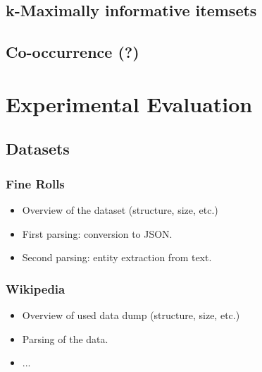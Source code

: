 \documentclass[paper=a4, fontsize=11pt]{scrartcl}
\begin{document}

\subsection{k-Maximally informative itemsets}

\subsection{Co-occurrence (?)}




\section{Experimental Evaluation}
\label{sec:experiments}

\subsection{Datasets}

\subsubsection{Fine Rolls}

\begin{itemize}
	\item Overview of the dataset (structure, size, etc.)
	\item First parsing: conversion to JSON.
	\item Second parsing: entity extraction from text.
\end{itemize}


\subsubsection{Wikipedia}
	
\begin{itemize}
	\item Overview of used data dump (structure, size, etc.)
	\item Parsing of the data.
	\item ...
\end{itemize}
\end{document}
